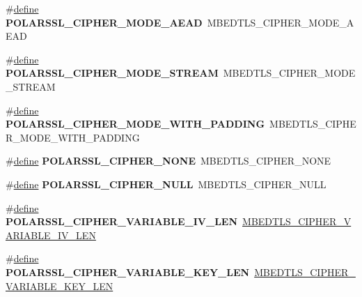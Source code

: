 \begin{DoxyCompactItemize}
\item 
\mbox{\label{compat-1_83_8h_a98537bee3c712431f7dce5c154e89164}} 
\#\hyperlink{structdefine}{define} {\bfseries P\+O\+L\+A\+R\+S\+S\+L\+\_\+\+C\+I\+P\+H\+E\+R\+\_\+\+M\+O\+D\+E\+\_\+\+A\+E\+AD}~M\+B\+E\+D\+T\+L\+S\+\_\+\+C\+I\+P\+H\+E\+R\+\_\+\+M\+O\+D\+E\+\_\+\+A\+E\+AD
\item 
\mbox{\label{compat-1_83_8h_aa7128958579e730a801d0c92340685ea}} 
\#\hyperlink{structdefine}{define} {\bfseries P\+O\+L\+A\+R\+S\+S\+L\+\_\+\+C\+I\+P\+H\+E\+R\+\_\+\+M\+O\+D\+E\+\_\+\+S\+T\+R\+E\+AM}~M\+B\+E\+D\+T\+L\+S\+\_\+\+C\+I\+P\+H\+E\+R\+\_\+\+M\+O\+D\+E\+\_\+\+S\+T\+R\+E\+AM
\item 
\mbox{\label{compat-1_83_8h_a5347e7fd4e1fbf8968317a34dd67bb9d}} 
\#\hyperlink{structdefine}{define} {\bfseries P\+O\+L\+A\+R\+S\+S\+L\+\_\+\+C\+I\+P\+H\+E\+R\+\_\+\+M\+O\+D\+E\+\_\+\+W\+I\+T\+H\+\_\+\+P\+A\+D\+D\+I\+NG}~M\+B\+E\+D\+T\+L\+S\+\_\+\+C\+I\+P\+H\+E\+R\+\_\+\+M\+O\+D\+E\+\_\+\+W\+I\+T\+H\+\_\+\+P\+A\+D\+D\+I\+NG
\item 
\mbox{\label{compat-1_83_8h_ad9096f5e136f037f6ea389a1214cae28}} 
\#\hyperlink{structdefine}{define} {\bfseries P\+O\+L\+A\+R\+S\+S\+L\+\_\+\+C\+I\+P\+H\+E\+R\+\_\+\+N\+O\+NE}~M\+B\+E\+D\+T\+L\+S\+\_\+\+C\+I\+P\+H\+E\+R\+\_\+\+N\+O\+NE
\item 
\mbox{\label{compat-1_83_8h_a3cfa3bb163d09c2ee18fe1ff7c7f3708}} 
\#\hyperlink{structdefine}{define} {\bfseries P\+O\+L\+A\+R\+S\+S\+L\+\_\+\+C\+I\+P\+H\+E\+R\+\_\+\+N\+U\+LL}~M\+B\+E\+D\+T\+L\+S\+\_\+\+C\+I\+P\+H\+E\+R\+\_\+\+N\+U\+LL
\item 
\mbox{\label{compat-1_83_8h_af1930bcb6327197ff0980aed8bfc3736}} 
\#\hyperlink{structdefine}{define} {\bfseries P\+O\+L\+A\+R\+S\+S\+L\+\_\+\+C\+I\+P\+H\+E\+R\+\_\+\+V\+A\+R\+I\+A\+B\+L\+E\+\_\+\+I\+V\+\_\+\+L\+EN}~\hyperlink{cipher_8h_a2a6dc5188d4a1e9bc43d9ea7c8505c6c}{M\+B\+E\+D\+T\+L\+S\+\_\+\+C\+I\+P\+H\+E\+R\+\_\+\+V\+A\+R\+I\+A\+B\+L\+E\+\_\+\+I\+V\+\_\+\+L\+EN}
\item 
\mbox{\label{compat-1_83_8h_a49772688b048b1048944402c3429bf41}} 
\#\hyperlink{structdefine}{define} {\bfseries P\+O\+L\+A\+R\+S\+S\+L\+\_\+\+C\+I\+P\+H\+E\+R\+\_\+\+V\+A\+R\+I\+A\+B\+L\+E\+\_\+\+K\+E\+Y\+\_\+\+L\+EN}~\hyperlink{cipher_8h_a882893bcfc917982037621f6e97968a6}{M\+B\+E\+D\+T\+L\+S\+\_\+\+C\+I\+P\+H\+E\+R\+\_\+\+V\+A\+R\+I\+A\+B\+L\+E\+\_\+\+K\+E\+Y\+\_\+\+L\+EN}

\end{DoxyCompactItemize}
